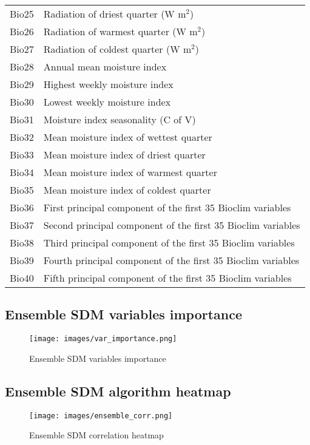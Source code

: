 \begin{table}
\begin{tabular}{ht}
Bio25 & Radiation of driest quarter (W  m$^2$) \\
Bio26 & Radiation of warmest quarter (W  m$^2$) \\
Bio27 & Radiation of coldest quarter (W  m$^2$) \\
Bio28 & Annual mean moisture index \\
Bio29 & Highest weekly moisture index \\
Bio30 & Lowest weekly moisture index \\
Bio31 & Moisture index seasonality (C of V) \\
Bio32 & Mean moisture index of wettest quarter \\
Bio33 & Mean moisture index of driest quarter \\
Bio34 & Mean moisture index of warmest quarter \\
Bio35 & Mean moisture index of coldest quarter \\
Bio36 & First principal component of the first 35 Bioclim variables \\
Bio37 & Second principal component of the first 35 Bioclim variables \\
Bio38 & Third principal component of the first 35 Bioclim variables \\
Bio39 & Fourth principal component of the first 35 Bioclim variables \\
Bio40 & Fifth principal component of the first 35 Bioclim variables \\
\hline
\end{tabular}
\label{tab:variables}
\end{table}
\pagebreak

\subsection{Ensemble SDM variables importance}
\begin{figure*}[!ht]
	\centering
	\texttt{[image: images/var\_importance.png]}
	\caption{Ensemble SDM variables importance}
	\label{fig:Ensemble SDM variables importance}
\end{figure*}

\subsection{Ensemble SDM algorithm heatmap}
\begin{figure*}[!ht]
	\centering
	\texttt{[image: images/ensemble\_corr.png]}
	\caption{Ensemble SDM correlation heatmap}
	\label{fig:Ensemble SDM correlation heatmap}
\end{figure*}

